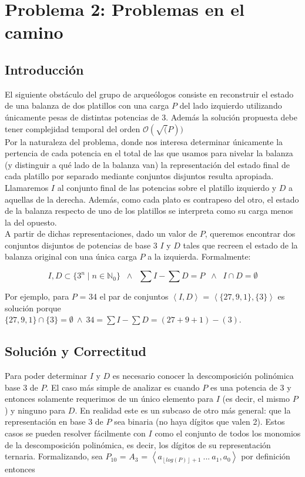 \newpage
\section{Problema 2: Problemas en el camino}

\subsection{Introducción}
	El siguiente obstáculo del grupo de arqueólogos consiste en reconstruir el estado de una balanza de dos platillos con una carga $P$ del lado izquierdo utilizando únicamente pesas de distintas potencias de 3. Además la solución propuesta debe tener complejidad temporal del orden $\mathcal{O}(\sqrt(P))$
	\\

	Por la naturaleza del problema, donde nos interesa determinar únicamente la pertencia de cada potencia en el total de las que usamos para nivelar la balanza (y distinguir a qué lado de la balanza van) la representación del estado final de cada platillo por separado mediante conjuntos disjuntos resulta apropiada. Llamaremos $I$ al conjunto final de las potencias sobre el platillo izquierdo y $D$ a aquellas de la derecha. Además, como cada plato es contrapeso del otro, el estado de la balanza respecto de uno de los platillos se interpreta como su carga menos la del opuesto.
	\\

	A partir de dichas representaciones, dado un valor de $P$, queremos encontrar dos conjuntos disjuntos de potencias de base 3 $I$ y $D$ tales que recreen el estado de la balanza original con una única carga $P$ a la izquierda. Formalmente:

$$
    I,D \subset \{3^n \;|\; n \in \mathbb{N}_0 \} \;\; \land \;\;
    \sum I - \sum D = P \;\; \land \;\;
    I \cap D = \emptyset
$$

	Por ejemplo, para $P$ = 34 el par de conjuntos $\left \langle I,D  \right \rangle$ = $\left \langle \{27,9,1\},\{3\}  \right \rangle$ es solución porque \\
	$\{27,9,1\} \cap \{3\} = \emptyset \ \wedge \ 34 = \sum I - \sum D = (27+9+1)-(3)$.
	\\



\subsection{Solución y Correctitud}
	Para poder determinar $I$ y $D$ es necesario conocer la descomposición polinómica base 3 de $P$. El caso más simple de analizar es cuando $P$ es una potencia de 3 y entonces solamente requerimos de un único elemento para $I$ (es decir, el mismo $P$) y ninguno para $D$. En realidad este es un subcaso de otro más general: que la representación en base 3 de $P$ sea binaria (no haya dígitos que valen 2). Estos casos se pueden resolver fácilmente con $I$ como el conjunto de todos los monomios de la descomposición polinómica, es decir, los dígitos de su representación ternaria. Formalizando, sea $P_{10}$ = $A_3$ = $\left \langle a_{ \left \lfloor{log(P)}\right \rfloor + 1 } \ ... \ a_1, a_0  \right \rangle$ por definición entonces \\

